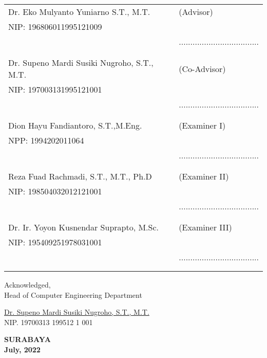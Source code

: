 \noindent
\begin{tabularx}{\textwidth}{X l}
	Dr. Eko Mulyanto Yuniarno S.T., M.T.          & (Advisor) \\
	NIP: 196806011995121009        & \\
	& ................................... \\
	&  \\
	&  \\
	Dr. Supeno Mardi Susiki Nugroho, S.T., M.T.     & (Co-Advisor) \\
	NIP: 197003131995121001        & \\
	& ................................... \\
	&  \\
	&  \\
	Dion Hayu Fandiantoro, S.T.,M.Eng.  & (Examiner I) \\
	NPP: 1994202011064        & \\
	& ................................... \\
	&  \\
	&  \\
	Reza Fuad Rachmadi, S.T., M.T., Ph.D  & (Examiner II) \\
	NIP: 198504032012121001        & \\
	& ................................... \\
	&  \\
	&  \\
	Dr. Ir. Yoyon Kusnendar Suprapto, M.Sc.             & (Examiner III) \\
	NIP: 195409251978031001        & \\
	& ................................... \\
	&  \\
	&  \\
\end{tabularx}
\endgroup


\begin{center}
	Acknowledged, \\
	Head of Computer Engineering Department\\
	
	\vspace{8ex}
	
	\underline{Dr. Supeno Mardi Susiki Nugroho, S.T., M.T.} \\
	NIP. 19700313 199512 1 001
\end{center}

\begin{center}
	\textbf{SURABAYA\\July, 2022}
\end{center}
\endgroup